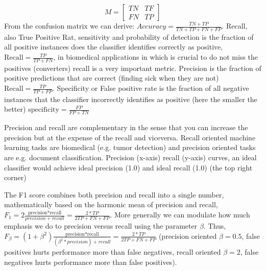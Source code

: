 \documentclass[11pt]{article}
\theoremstyle{definition}
\theoremstyle{remark}
\begin{document}
{ %
\[
M=
  \begin{bmatrix}
    TN & TF  \\
    FN & TP 
  \end{bmatrix}
\]
From the confusion matrix we can derive:
$\textit{Accuracy} = \frac{TN + TP}{TN+TP+FN+FP}$. 
Recall, also True Positive Rat, sensitivity and probability of detection  is the fraction of all positive instances does the classifier identifies correctly as positive, $\text{Recall} = \frac{TP}{TP+FN}$, in biomedical applications in which is crucial to do not miss the positives (converters) recall is a very important metric.
Precision is the fraction of positive predictions that are correct (finding sick when they are not) $\text{Recall} = \frac{TP}{TP+FP}$.
Specificity or False positive rate is the fraction of all negative instances that the classifier incorrectly identifies as positive (here the smaller the better)  $\text{specificity} = \frac{FP}{FP+TN}$

Precision and recall are complementary in the sense that you can increase the precision but at the expense of the recall and viceversa. Recall oriented machine learning tasks are biomedical (e.g. tumor detection) and precision oriented tasks are e.g. document classification. Precision (x-axis) recall (y-axis) curves, an ideal classifier would achieve ideal precision (1.0) and ideal recall (1.0) (the top right corner) 

The F1 score combines both precision and recall into a single number, mathematically based on the harmonic mean of precision and recall, $F_1 = 2\frac{\text{precision*recall}}{precision+recall} = \frac{2 * TP}{2TP + FN + FP}$. More generally we can modulate how much emphasis we do to precision versus recall using the parameter $\beta$. Thus, $F_\beta = (1+\beta^2)\frac{\text{precision*recall}}{(\beta^2 * precision)+recall} = \frac{2 * TP}{2TP + FN + FP}$ (precision oriented $\beta=0.5$, false positives hurts performance more than false negatives, recall oriented $\beta=2$, false negatives hurts performance more than false positives).

}
\end{document}
